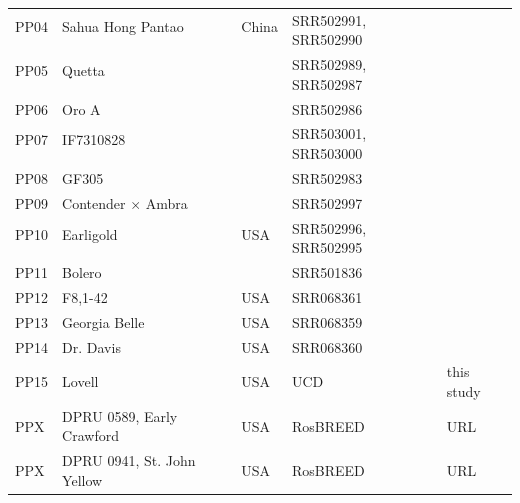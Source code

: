 \documentclass[12pt]{article}
\begin{document}
\begin{center}
\begin{longtable}{lllll}
                 \\
                 PP04 &Sahua Hong Pantao &China &\multirow{2}{1cm}{SRR502991, SRR502990} &\citealt{verde2013high}\\
                 \\
                 PP05 &Quetta & &\multirow{2}{1cm}{SRR502989, SRR502987} &\citealt{verde2013high}\\
                 \\
                 PP06 &Oro A & &SRR502986 &\citealt{verde2013high}\\
                 PP07 &IF7310828 & &\multirow{2}{1cm}{SRR503001, SRR503000} &\citealt{verde2013high}\\
                 \\
                 PP08 &GF305 & &SRR502983 &\citealt{verde2013high}\\
                 PP09 &Contender $\times$ Ambra & &SRR502997 &\citealt{verde2013high}\\
                 PP10 &Earligold &USA &\multirow{2}{1cm}{SRR502996, SRR502995} &\citealt{verde2013high}\\
                 \\
                 PP11 &Bolero & &SRR501836 &\citealt{verde2013high}\\
                 PP12 &F8,1-42 &USA &SRR068361 &\citealt{ahmad2011whole} \\
                 PP13 &Georgia Belle &USA &SRR068359 &\citealt{ahmad2011whole} \\
                 PP14 &Dr. Davis &USA &SRR068360 &\citealt{ahmad2011whole} \\
                 PP15 &Lovell &USA &UCD &this study\\
                 PP{\color{red}X} &DPRU 0589, Early Crawford&USA &RosBREED &URL \\
                 PP{\color{red}X} &DPRU 0941, St. John Yellow &USA &RosBREED &URL \\

\end{longtable}
\end{center}
\end{document}
